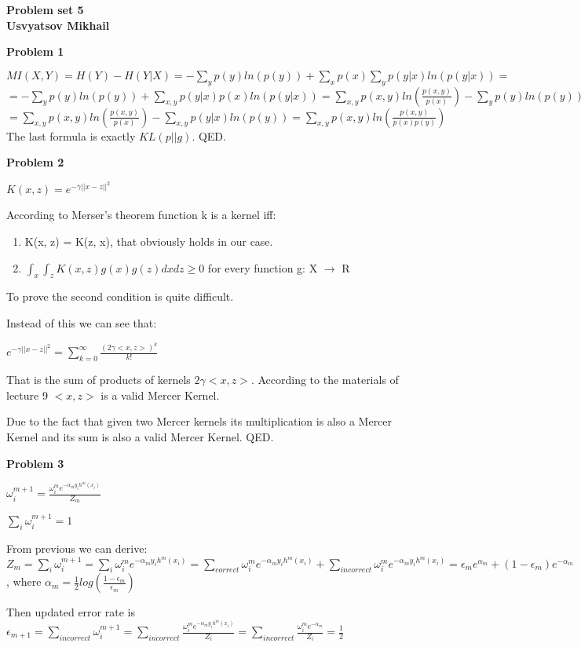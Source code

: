 \documentclass[12pt]{article}
\begin{document}
	\begin{center}
		\textbf{Problem set 5\\ Usvyatsov Mikhail}
	\end{center}
		
	\bigskip
	
	\textbf{Problem 1}
	
	\medskip
	$MI(X, Y) = H(Y) - H(Y|X) = - \sum_{y}p(y)ln(p(y)) + \sum_{x}p(x)\sum_{y}p(y|x)ln(p(y|x)) =$\\
	$=- \sum_{y}p(y)ln(p(y)) + \sum_{x, y}p(y|x)p(x)ln(p(y|x)) =  \sum_{x, y}p(x, y)ln(\frac{p(x, y)}{p(x)}) - \sum_{y}p(y)ln(p(y))=$\\
	$=\sum_{x, y}p(x, y)ln(\frac{p(x, y)}{p(x)}) - \sum_{x, y}p(y|x)ln(p(y))= \sum_{x, y}p(x, y)ln\left(\frac{p(x, y)}{p(x)p(y)}\right)$\\
	The last formula is exactly $KL(p||g)$. QED.
	\bigskip

	\textbf{Problem 2}
	
	\medskip
	
	$K(x, z) = e^{-\gamma || x - z ||^2}$
	
	According to Merser's theorem function k is a kernel iff:
	
	\begin{enumerate}
		\item
			K(x, z) = K(z, x), that obviously holds in our case.
		\item
			$\int_x\int_z K(x, z) g(x)g(z) dx dz \geq 0$ for every function g: X $\rightarrow$ R
	\end{enumerate}
	
	To prove the second condition is quite difficult.
	
	Instead of this we can see that:
	
	$e^{-\gamma || x - z ||^2} = \sum_{k=0}^{\infty} \frac{(2 \gamma <x, z>)^k}{k!}$
	
	That is the sum of products of kernels $2 \gamma <x, z>$.
	According to the materials of lecture 9 $<x, z>$ is a valid Mercer Kernel.
	
	Due to the fact that given two Mercer kernels its multiplication is also a Mercer Kernel and its sum is also a valid Mercer Kernel. QED.
	
	\medskip
	
	\textbf{Problem 3}
	\medskip
	
	$\omega_i^{m+1} = \frac{\omega_i^m e^{-\alpha_m y_i h^m(x_i)}}{Z_m}$
	
	$\sum_{i} \omega_i^{m+1} = 1$
	
	From previous we can derive:
	$Z_m = \sum_{i} \omega_i^{m+1} = \sum_i \omega_i^m e^{-\alpha_m y_i h^m(x_i)} = \sum_{correct} \omega_i^m e^{-\alpha_m y_i h^m(x_i)} + \sum_{incorrect} \omega_i^m e^{-\alpha_m y_i h^m(x_i)} = \epsilon_m  e^{\alpha_m} + (1 - \epsilon_m)e^{-\alpha_m}$, where $\alpha_m = \frac{1}{2} log\left( \frac{1-\epsilon_m}{\epsilon_m} \right)$
	
	Then updated error rate is $\epsilon_{m+1} = \sum_{incorrect} \omega_i^{m + 1} = \sum_{incorrect} \frac{\omega_i^m e^{-\alpha_m y_i h^m(x_i)}}{Z_i} = \sum_{incorrect} \frac{\omega_i^m e^{-\alpha_m}}{Z_i} = \frac{1}{2}$
	\medskip
\end{document}
